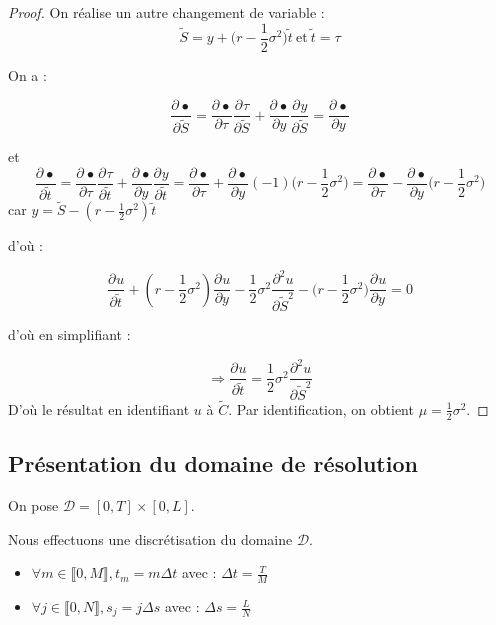 \documentclass[11pt,a4paper]{article}
\newcommand{\deriv}[3][]{%
  \ensuremath{\frac{\partial^{#1} {#2}}{\partial {#3}^{#1}}}}
\newcommand*{\intval}[2]{\llbracket #1, #2 \rrbracket}
\theoremstyle{plain}
\begin{document}
\begin{proof}
On réalise un autre changement de variable :
$$
\boxed{\widetilde{S} = y + \Big(r - \frac{1}{2}\sigma^2\Big)\widetilde{t}} \ \text{et} \ \boxed{\widetilde{t} = \tau}
$$

On a :

$$
\deriv{\bullet}{\widetilde{S}} = \deriv{\bullet}{\tau}\deriv{\tau}{\widetilde{S}} + \deriv{\bullet}{y}\deriv{y}{\widetilde{S}} = \deriv{\bullet}{y}
$$

et 
$$
\deriv{\bullet}{\widetilde{t}} = \deriv{\bullet}{\tau}\deriv{\tau}{\widetilde{t}} + \deriv{\bullet}{y}\deriv{y}{\widetilde{t}} = \deriv{\bullet}{\tau} + \deriv{\bullet}{y}(-1)\Big(r - \frac{1}{2}\sigma^2\Big) = \deriv{\bullet}{\tau} - \deriv{\bullet}{y}\Big(r - \frac{1}{2}\sigma^2\Big)
$$
car $y = \widetilde{S} - (r - \frac{1}{2}\sigma^2)\widetilde{t}$

d'où :

$$
\deriv{u}{\widetilde{t}} + (r - \frac{1}{2}\sigma^2)\deriv{u}{y} - \frac{1}{2}\sigma^2\deriv[2]{u}{\widetilde{S}} - \Big(r - \frac{1}{2}\sigma^2\Big)\deriv{u}{y} = 0
$$

d'où en simplifiant :

$$
\Longrightarrow \deriv{u}{\widetilde{t}} = \frac{1}{2}\sigma^2\deriv[2]{u}{\widetilde{S}}
$$
D'où le résultat en identifiant $u$ à $\widetilde{C}$. Par identification, on obtient $\boxed{\mu = \frac{1}{2}\sigma^2}$.
\end{proof}




\subsection{Présentation du domaine de résolution}
On pose $\mathcal{D} = \left[0, T\right]\times\left[0, L\right]$.

Nous effectuons une discrétisation du domaine $\mathcal{D}$.

\begin{itemize}
    \item $\forall m \in \intval{0}{M}, \boxed{t_m = m\Delta t}$ avec : $\Delta t = \frac{T}{M}$
    \item $\forall j \in \intval{0}{N}, \boxed{s_j = j\Delta s}$ avec : $\Delta s = \frac{L}{N}$
\end{itemize}
\end{document}
